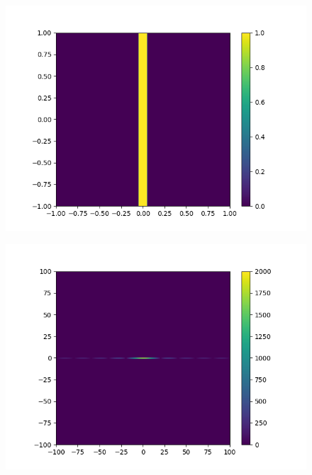 \begin{figure}[htbp]
	\begin{minipage}[ht]{0.48\hsize}\centering
		\includegraphics[width=\linewidth]{src/figures/result/ss1_original_estimation.png}
		\label{subfig:amplitude_sim_single1_original}
	\end{minipage}
	\begin{minipage}[ht]{0.48\hsize}\centering
		\includegraphics[width=\linewidth]{src/figures/result/ss1_amplitude_estimation.png}
		\label{subfig:amplitude_sim_single1}
	\end{minipage}
	\begin{minipage}[ht]{0.48\hsize}\centering

\end{minipage}
\end{figure}
